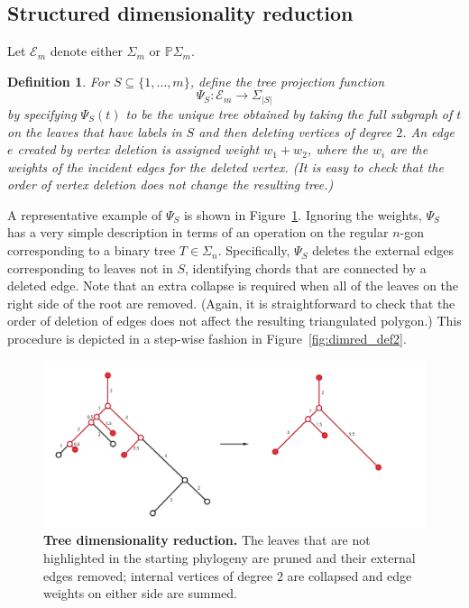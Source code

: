 \documentclass[a4paper,11pt]{article}
\newtheorem{definition}[theorem]{Definition}
\newcommand{\aE}{\mathcal{E}}
\begin{document}
\subsection{Structured dimensionality reduction}

Let $\aE_m$ denote either $\Sigma_m$ or $\mathbb{P}\Sigma_m$.

\begin{definition}
For $S \subseteq \{1,\ldots,m\}$, define the tree projection function 
\[
\Psi_S \colon \aE_m \to \Sigma_{|S|}
\] 
by specifying $\Psi_S(t)$ to be the unique tree obtained by taking the full subgraph of $t$ on the leaves that have labels in $S$ and then deleting vertices of degree $2$.
An edge $e$ created by vertex deletion is assigned weight $w_1 + w_2$, where the $w_i$ are the weights of the incident edges for the deleted vertex.
(It is easy to check that the order of vertex deletion does not change the resulting tree.)
\end{definition}

A representative example of $\Psi_S$ is shown in Figure~\ref{fig:dimred_tree-dim-red}.
Ignoring the weights, $\Psi_S$ has a very simple description in terms of an operation on the regular $n$-gon corresponding to a binary tree $T \in \Sigma_n$.
Specifically, $\Psi_S$ deletes the external edges corresponding to leaves not in $S$, identifying chords that are connected by a deleted edge.
Note that an extra collapse is required when all of the leaves on the right side of the root are removed.
(Again, it is straightforward to check that the order of deletion of edges does not affect the resulting triangulated polygon.)
This procedure is depicted in a step-wise fashion in Figure~\ref{fig:dimred_def2}.

\begin{figure}
    \centering
    \includegraphics[width=6in]{../figures/dimred_tree-dim-red.pdf}
    \caption{{\bf Tree dimensionality reduction.} The leaves that are not highlighted in the starting phylogeny are pruned and their external edges removed; internal vertices of degree $2$ are collapsed and edge weights on either side are summed.}
    \label{fig:dimred_tree-dim-red}
\end{figure} 
\end{document}
